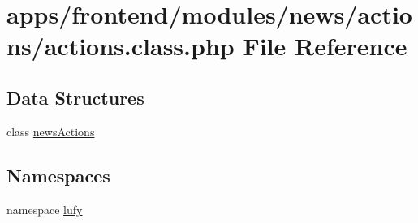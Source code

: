 \hypertarget{frontend_2modules_2news_2actions_2actions_8class_8php}{\section{apps/frontend/modules/news/actions/actions.class.\-php File Reference}
\label{frontend_2modules_2news_2actions_2actions_8class_8php}
}
\subsection*{Data Structures}
\begin{DoxyCompactItemize}
\item 
class \hyperlink{classnews_actions}{news\-Actions}
\end{DoxyCompactItemize}
\subsection*{Namespaces}
\begin{DoxyCompactItemize}
\item 
namespace \hyperlink{namespacelufy}{lufy}
\end{DoxyCompactItemize}
